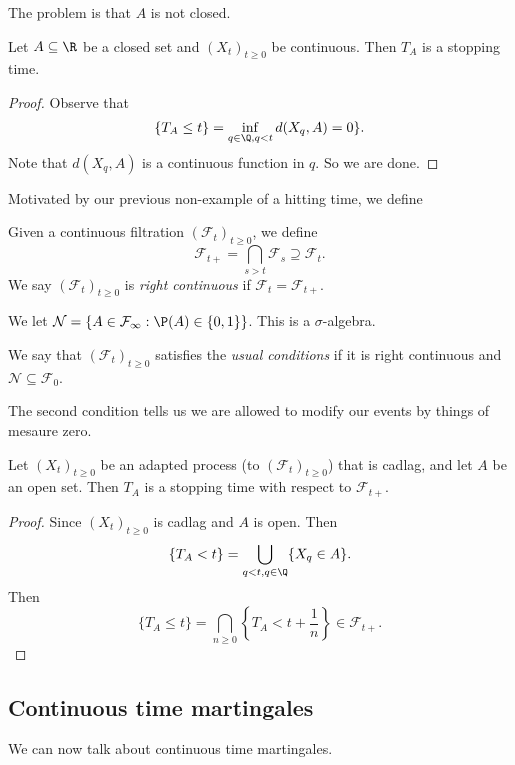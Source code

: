 \documentclass[a4paper]{article}
\begin{document}
The problem is that $A$ is not closed.

\begin{prop}
  Let $A \subseteq \R$ be a closed set and $(X_t)_{t \geq 0}$ be continuous. Then $T_A$ is a stopping time.
\end{prop}

\begin{proof}
  Observe that
  \[
    \{T_A \leq t\} = \inf_{q \in \Q, q < t} d(X_q, A) = 0\}.
  \]
  Note that $d(X_q, A)$ is a continuous function in $q$. So we are done.
\end{proof}

Motivated by our previous non-example of a hitting time, we define
\begin{defi}
  Given a continuous filtration $(\mathcal{F}_t)_{t \geq 0}$, we define
  \[
    \mathcal{F}_{t+} = \bigcap_{s > t} \mathcal{F}_s \supseteq \mathcal{F}_t.
  \]
  We say $(\mathcal{F}_t)_{t \geq 0}$ is \emph{right continuous} if $\mathcal{F}_t = \mathcal{F}_{t+}$.
\end{defi}

We let $\mathcal{N} = \{A \in \mathcal{F}_\infty : \P(A) \in \{0, 1\}\}$. This is a $\sigma$-algebra.
\begin{defi}
  We say that $(\mathcal{F}_t)_{t \geq 0}$ satisfies the \emph{usual conditions} if it is right continuous and $\mathcal{N} \subseteq \mathcal{F}_0$.
\end{defi}
The second condition tells us we are allowed to modify our events by things of mesaure zero.

\begin{prop}
  Let $(X_t)_{t \geq 0}$ be an adapted process (to $(\mathcal{F}_{t})_{t \geq 0}$) that is cadlag, and let $A$ be an open set. Then $T_A$ is a stopping time with respect to $\mathcal{F}_{t+}$.
\end{prop}

\begin{proof}
  Since $(X_t)_{t \geq 0}$ is cadlag and $A$ is open. Then
  \[
    \{T_A < t\} = \bigcup_{q < t, q \in \Q} \{X_q \in A\}.
  \]
  Then
  \[
    \{T_A \leq t\} = \bigcap_{n \geq 0} \left\{T_A < t + \frac{1}{n}\right\} \in \mathcal{F}_{t+}.
  \]
\end{proof}

\subsection{Continuous time martingales}
We can now talk about continuous time martingales.
\end{document}
